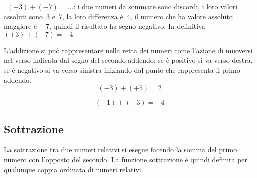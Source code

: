  \begin{esempio}{}{}
~\((+3)+(-7)=\ldots\): i due numeri da sommare sono discordi, i loro valori 
assoluti sono~3 e~7, la loro differenza è~4,
il numero che ha valore assoluto maggiore è~\(-7\), quindi il risultato ha 
segno 
negativo.
In definitiva~\((+3)+(-7)=-4\)
 \end{esempio}

L'addizione si può rappresentare nella retta dei numeri come l'azione di 
muoversi nel verso indicata dal segno del
secondo addendo: se è positivo si va verso destra, se è negativo si va 
verso 
sinistra iniziando dal punto che
rappresenta il primo addendo.
 \[(-3)+(+5)=2\]
\begin{center}
\sommaa
%  
\end{center}
\[ (-1)+(-3) = -4\]
\begin{center}
\sommab
%  
\end{center}

\subsection{Sottrazione}

La sottrazione tra due numeri relativi si esegue facendo la somma del primo 
numero con l'opposto del secondo.
La funzione sottrazione è quindi definita per qualunque coppia ordinata di 
numeri relativi.


